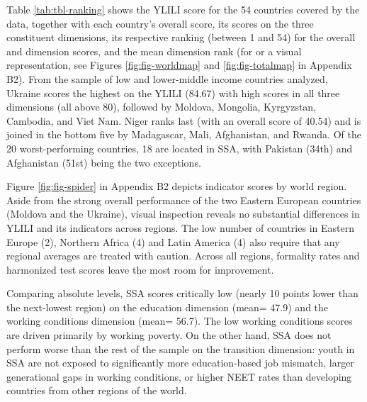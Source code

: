 \documentclass[
  a4paper, twoside, 12pt]{book}
\begin{document}


Table \ref{tab:tbl-ranking} shows the YLILI score for the 54 countries covered by the data, together with each country's overall score, its scores on the three constituent dimensions, its respective ranking (between 1 and 54) for the overall and dimension scores, and the mean dimension rank (for or a visual representation, see Figures \ref{fig:fig-worldmap} and \ref{fig:fig-totalmap} in Appendix B2). From the sample of low and lower-middle income countries analyzed, Ukraine scores the highest on the YLILI (84.67) with high scores in all three dimensions (all above 80), followed by Moldova, Mongolia, Kyrgyzstan, Cambodia, and Viet Nam. Niger ranks last (with an overall score of 40.54) and is joined in the bottom five by Madagascar, Mali, Afghanistan, and Rwanda. Of the 20 worst-performing countries, 18 are located in SSA, with Pakistan (34th) and Afghanistan (51st) being the two exceptions.

Figure \ref{fig:fig-spider} in Appendix B2 depicts indicator scores by world region. Aside from the strong overall performance of the two Eastern European countries (Moldova and the Ukraine), visual inspection reveals no substantial differences in YLILI and its indicators across regions. The low number of countries in Eastern Europe (2), Northern Africa (4) and Latin America (4) also require that any regional averages are treated with caution. Across all regions, formality rates and harmonized test scores leave the most room for improvement.

Comparing absolute levels, SSA scores critically low (nearly 10 points lower than the next-lowest region) on the education dimension (mean= 47.9) and the working conditions dimension (mean= 56.7). The low working conditions scores are driven primarily by working poverty. On the other hand, SSA does not perform worse than the rest of the sample on the transition dimension: youth in SSA are not exposed to significantly more education-based job mismatch, larger generational gaps in working conditions, or higher NEET rates than developing countries from other regions of the world.


\end{document}
